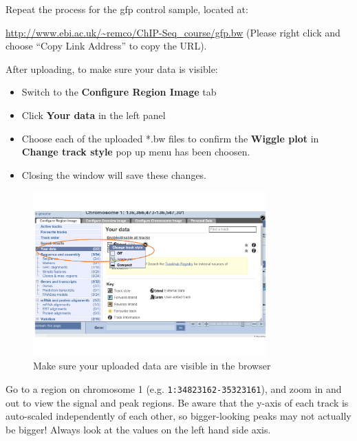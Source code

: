 \begin{steps}
Repeat the process for the gfp control sample, located at:

\url{http://www.ebi.ac.uk/~remco/ChIP-Seq_course/gfp.bw} (Please right click and choose ``Copy Link Address'' to copy the URL).

After uploading, to make sure your data is visible:
\begin{itemize}
        \item Switch to the \textbf{Configure Region Image} tab
        \item Click \textbf{Your data} in the left panel
        \item Choose each of the uploaded *.bw files to confirm the \textbf{Wiggle plot} in \textbf{Change track style} pop up menu has been choosen.
        \item Closing the window will save these changes.

\end{itemize}

\begin{figure}[H]
\centering
\includegraphics[width=0.8\textwidth]{ConfigureYourData.png}
\caption{Make sure your uploaded data are visible in the browser}
\label{fig:ConfigureYourData}
\end{figure}

Go to a region on chromosome 1 (e.g. \texttt{1:34823162-35323161}), and zoom in and out
to view the signal and peak regions. Be aware that the y-axis of each track is auto-scaled independently of each other,
so bigger-looking peaks may not actually be bigger! Always look at the values
on the left hand side axis.
\end{steps}

